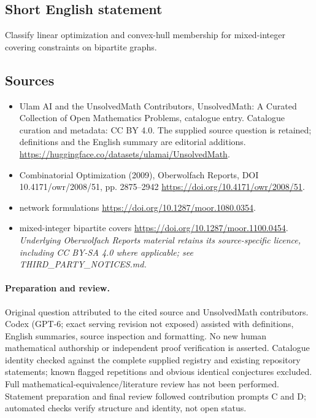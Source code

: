 \documentclass[11pt]{article}
\begin{document}
\subsection{Short English statement}
Classify linear optimization and convex-hull membership for mixed-integer covering constraints on bipartite graphs.
\subsection{Sources}
\begin{itemize}
\item[\hypertarget{source:statement:1}{S1}] Ulam AI and the UnsolvedMath Contributors, UnsolvedMath: A Curated Collection of Open Mathematics Problems, catalogue entry. Catalogue curation and metadata: CC BY 4.0. The supplied source question is retained; definitions and the English summary are editorial additions.
\url{https://huggingface.co/datasets/ulamai/UnsolvedMath}.
\item[\hypertarget{source:statement:2}{S2}] Combinatorial Optimization (2009), Oberwolfach Reports, DOI 10.4171/owr/2008/51, pp. 2875--2942
\url{https://doi.org/10.4171/owr/2008/51}.
\item[\hypertarget{source:statement:3}{S3}] network formulations
\url{https://doi.org/10.1287/moor.1080.0354}.
\item[\hypertarget{source:statement:4}{S4}] mixed-integer bipartite covers
\url{https://doi.org/10.1287/moor.1100.0454}.
\textit{Underlying Oberwolfach Reports material retains its source-specific licence, including CC BY-SA 4.0 where applicable; see THIRD\_PARTY\_NOTICES.md.}
\end{itemize}
\paragraph{Preparation and review.}
Original question attributed to the cited source and UnsolvedMath contributors. Codex (GPT-6; exact serving revision not exposed) assisted with definitions, English summaries, source inspection and formatting. No new human mathematical authorship or independent proof verification is asserted. Catalogue identity checked against the complete supplied registry and existing repository statements; known flagged repetitions and obvious identical conjectures excluded. Full mathematical-equivalence/literature review has not been performed. Statement preparation and final review followed contribution prompts C and D; automated checks verify structure and identity, not open status.
\label{end:statement}
\end{document}
